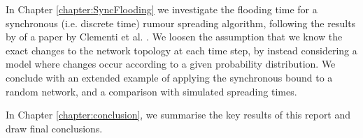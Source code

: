 In Chapter \ref{chapter:SyncFlooding} we investigate the flooding time for a synchronous (i.e. discrete time) rumour spreading algorithm, following the results by of a paper by Clementi et al. \cite{syncPaper}. We loosen the assumption that we know the exact changes to the network topology at each time step, by instead considering a model where changes occur according to a given probability distribution. We conclude with an extended example of applying the synchronous bound to a random network, and a comparison with simulated spreading times. 

In Chapter \ref{chapter:conclusion}, we summarise the key results of this report and draw final conclusions.
